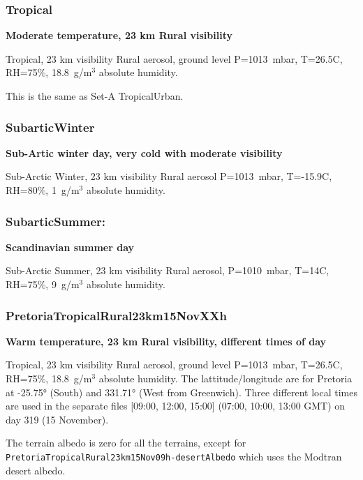 \documentclass{workpackage}
\begin{document}
\subsubsection{Tropical}
\label{sec:Tropical}

\textbf{Moderate temperature, 23 km Rural visibility}

Tropical, 23 km visibility  Rural aerosol, ground level P=1013~mbar, T=26.5C, RH=75\%, 18.8~g/m$^3$ absolute humidity.

This is the same as Set-A TropicalUrban.

\subsubsection{SubarticWinter}
\label{sec:SubarticWinter}

\textbf{Sub-Artic winter day, very cold with moderate visibility}

Sub-Arctic Winter, 23 km visibility  Rural aerosol
 P=1013~mbar, T=-15.9C, RH=80\%, 1~g/m$^3$ absolute humidity.

\subsubsection{SubarticSummer:}
\label{sec:SubarticSummer}

\textbf{Scandinavian summer day }

Sub-Arctic Summer, 23 km visibility  Rural  aerosol, P=1010~mbar, T=14C, RH=75\%, 9~g/m$^3$ absolute humidity.


\subsubsection{PretoriaTropicalRural23km15NovXXh}
\label{sec:PretoriaTropicalRural23km15NovXXh}

\textbf{Warm temperature, 23 km Rural visibility, different times of day}

Tropical, 23 km visibility  Rural aerosol, ground level P=1013~mbar, T=26.5C, RH=75\%, 18.8~g/m$^3$ absolute humidity.
The lattitude/longitude are for Pretoria at  -25.75\si{\degree} (South) and 331.71\si{\degree} (West from Greenwich).
Three different local times are used in the separate files [09:00, 12:00, 15:00] (07:00, 10:00, 13:00 GMT) on day 319 (15 November).

The terrain albedo is zero for all the terrains, except for 
\lstinline{PretoriaTropicalRural23km15Nov09h-desertAlbedo} which uses the Modtran desert albedo.
\end{document}
